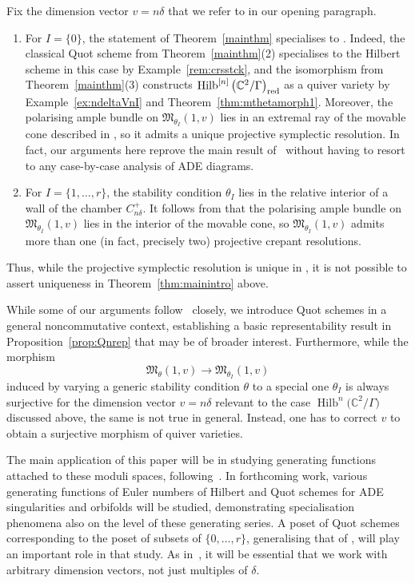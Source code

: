 \documentclass[10pt,a4paper]{amsart}
\newcommand{\SC}{\mathbb{C}} %
\DeclareMathOperator{\Hilb}{\mathrm{Hilb}}
\numberwithin{equation}{section}
\begin{document}
 \begin{Remark}
 Fix the dimension vector $v=n\delta$ that we refer to in our opening paragraph.
 \begin{enumerate}\itemsep=0pt
 \item For $I=\{0\}$, the statement of
 Theorem~\ref{mainthm} specialises to \cite[Theorem~1.1]{craw2019punctual}.
 Indeed, the classical Quot scheme from Theorem~\ref{mainthm}(2) specialises to the Hilbert scheme in this case by Example~\ref{rem:crsstck}, and the isomorphism from Theorem~\ref{mainthm}(3) constructs $\Hilb^{[n]}\big(\mathbb{C}^2/\Gamma\big)_{\rm red}$ as a quiver variety by Example~\ref{ex:ndeltaVnI} and Theorem~\ref{thm:mthetamorph1}. Moreover, the polarising ample bundle on $\mathfrak{M}_{\theta_I}(1,v)$ lies in an extremal ray of the movable cone described in \cite{bellamy2020birational}, so it admits a unique projective symplectic resolution.
 In fact, our arguments here reprove the main result of~\cite{craw2019punctual} without having to resort to any case-by-case analysis of ADE diagrams.
 \item For $I=\{1,\dots, r\}$, the stability condition $\theta_I$ lies in the relative interior of a wall of the chamber $C^+_{n\delta}$. It follows from \cite[Theorem~1.2]{bellamy2020birational} that the polarising ample bundle on $\mathfrak{M}_{\theta_I}(1,v)$ lies in the interior of the movable cone, so $\mathfrak{M}_{\theta_I}(1,v)$ admits more than one (in fact, precisely two) projective crepant resolutions.
 \end{enumerate}
 Thus, while the projective symplectic resolution is unique in \cite[Theorem~1.1]{craw2019punctual}, it is not possible to assert uniqueness
 in Theorem~\ref{thm:mainintro} above.
 \end{Remark}

While some of our
arguments follow~\cite{craw2019punctual} closely,
we introduce
Quot schemes in a general noncommutative
context, establishing a basic representability result in Proposition~\ref{prop:Qnrep} that may be of broader interest. Furthermore, while the
morphism
\[ \mathfrak{M}_\theta(1,v) \longrightarrow \mathfrak{M}_{\theta_I}(1,v) \]
induced by varying a generic stability condition $\theta$ to a special one $\theta_I$ is always surjective for the
dimension vector $v=n\delta$ relevant to the case $\Hilb^n\big(\SC^2/\Gamma\big)$ discussed above,
the same is not true in general.
Instead, one has to correct $v$ to
obtain a surjective morphism of quiver varieties.

The main application of
this paper will be in studying
generating functions attached to these moduli spaces,
following~\cite{gyenge2017euler, gyenge2018euler}.
In forthcoming work, various generating functions of Euler numbers of Hilbert
and Quot schemes for ADE singularities and orbifolds will be studied, demonstrating
specialisation phenomena also on the level of these generating series.
A poset of Quot schemes corresponding to the poset of
subsets of $\{0, \dots, r\}$,
generalising that of \cite[Section~5]{craw2019punctual},
will play an important role in that study.
As in~\cite{gyenge2017euler, gyenge2018euler}, it will be essential
that we work with arbitrary dimension vectors,
not just multiples of $\delta$.
\end{document}
